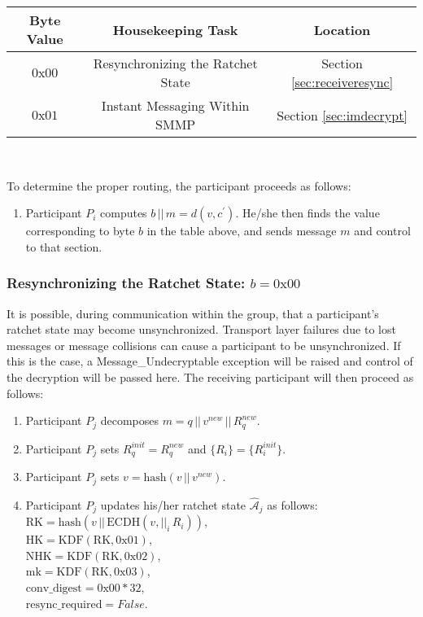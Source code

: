 \documentclass[%
preprint,
amsmath,amssymb,
aps,
prb,
floatfix,
]{revtex4-1}
\begin{document}
\begin{centering}
\begin{tabular}{|c|c|c|}
\hline
Byte Value & Housekeeping Task & Location \\
\hline
$0\mathrm{x}00$ & Resynchronizing the Ratchet State  & Section \ref{sec:receiveresync}\\
$0\mathrm{x}01$ & Instant Messaging Within SMMP & Section \ref{sec:imdecrypt}\\
\hline
\end{tabular} \\
\end{centering}
\bigskip
To determine the proper routing, the
participant proceeds as follows:
\begin{enumerate}
\item Participant $P_i$ computes $b \, || \, m = d(v, c^\prime)$. He/she then
finds the value corresponding to byte $b$ in the table above, and sends message
$m$ and control to that section.
\end{enumerate}
\subsubsection{\label{sec:receiveresync}Resynchronizing the Ratchet State: $b =
0\mathrm{x}00$}
It is possible, during communication within the group, that a participant's
ratchet state may become unsynchronized. Transport layer failures due to lost
messages or message collisions can cause a participant to be unsynchronized. If
this is the case, a Message\_Undecryptable exception will be raised
and control of the decryption will be passed here. The receiving participant
will then proceed as follows:
\begin{enumerate}
\item Participant $P_j$ decomposes $m = q \, || \, v^{new} \, || \, R_q^{new}$.
\item Participant $P_j$ sets $R_q^{init} = R_q^{new}$ and $\{R_i\} =
\{R_i^{init}\}$.
\item Participant $P_j$ sets $v = \mathrm{hash}(v \, || \, v^{new})$.
\item Participant $P_j$ updates his/her ratchet state
$\mathcal{\hat{A}}_j$ as follows:\\
$\mathrm{RK} = \mathrm{hash}(v \, || \, \mathrm{ECDH}(v, ||_i
\, R_i))$, \\
$\mathrm{HK} = \mathrm{KDF}(\mathrm{RK}, 0\mathrm{x}01)$, \\
$\mathrm{NHK} = \mathrm{KDF}(\mathrm{RK}, 0\mathrm{x}02)$, \\
$\mathrm{mk} = \mathrm{KDF}(\mathrm{RK}, 0\mathrm{x}03)$, \\
$\mathrm{conv\_digest} = 0\mathrm{x}00 * 32$, \\
$\mathrm{resync\_required} = False$.
\end{enumerate}
\end{document}
